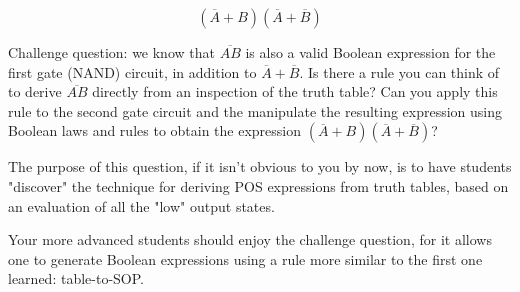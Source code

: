 $$(\overline{A} + B)(\overline{A} + \overline{B})$$

\vskip 10pt

Challenge question: we know that $\overline{AB}$ is also a valid Boolean expression for the first gate (NAND) circuit, in addition to $\overline{A} + \overline{B}$.  Is there a rule you can think of to derive $\overline{AB}$ directly from an inspection of the truth table?  Can you apply this rule to the second gate circuit and the manipulate the resulting expression using Boolean laws and rules to obtain the expression $(\overline{A} + B)(\overline{A} + \overline{B})$?







The purpose of this question, if it isn't obvious to you by now, is to have students "discover" the technique for deriving POS expressions from truth tables, based on an evaluation of all the "low" output states.

Your more advanced students should enjoy the challenge question, for it allows one to generate Boolean expressions using a rule more similar to the first one learned: table-to-SOP.




